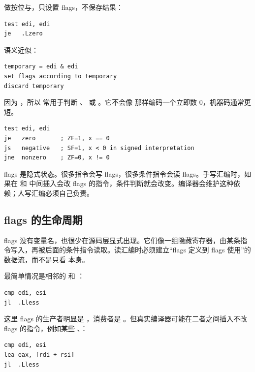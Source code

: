  做按位与，只设置 flags，不保存结果：

\begin{lstlisting}
test edi, edi
je   .Lzero
\end{lstlisting}

语义近似：

\begin{lstlisting}
temporary = edi & edi
set flags according to temporary
discard temporary
\end{lstlisting}

因为 ，所以  常用于判断 、 或 。它不会像  那样编码一个立即数 0，机器码通常更短。

\begin{lstlisting}
test edi, edi
je   zero       ; ZF=1, x == 0
js   negative   ; SF=1, x < 0 in signed interpretation
jne  nonzero    ; ZF=0, x != 0
\end{lstlisting}

\begin{warningbox}
flags 是隐式状态。很多指令会写 flags，很多条件指令会读 flags。手写汇编时，如果在  和  中间插入会改 flags 的指令，条件判断就会改变。编译器会维护这种依赖；人写汇编必须自己负责。
\end{warningbox}

\subsection{flags 的生命周期}

flags 没有变量名，也很少在源码层显式出现。它们像一组隐藏寄存器，由某条指令写入，再被后面的条件指令读取。读汇编时必须建立“flags 定义到 flags 使用”的数据流，而不是只看  本身。

最简单情况是相邻的  和 ：

\begin{lstlisting}
cmp edi, esi
jl  .Lless
\end{lstlisting}

这里 flags 的生产者明显是 ，消费者是 。但真实编译器可能在二者之间插入不改 flags 的指令，例如某些 、：

\begin{lstlisting}
cmp edi, esi
lea eax, [rdi + rsi]
jl  .Lless
\end{lstlisting}

